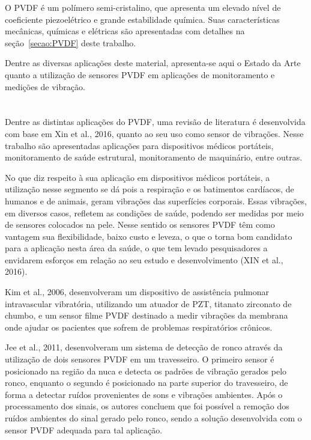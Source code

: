\documentclass[
	12pt,				
	oneside,			
	a4paper,			
	english,			
	brazil,			
	]{abntex2ppgsi}
\begin{document}
O PVDF é um polímero semi-cristalino, que apresenta um elevado nível de coeficiente piezoelétrico e grande estabilidade química. Suas características mecânicas, químicas e elétricas são apresentadas com detalhes na seção~\ref{secao:PVDF} deste trabalho. 

Dentre as diversas aplicações deste material, apresenta-se aqui o Estado da Arte quanto a utilização de sensores PVDF em aplicações de monitoramento e medições de vibração.

\section{}

Dentre as distintas aplicações do PVDF, uma revisão de literatura é desenvolvida com base em Xin et al., 2016, quanto ao seu uso como sensor de vibrações. Nesse trabalho são apresentadas aplicações para dispositivos médicos portáteis, monitoramento de saúde estrutural, monitoramento de maquinário, entre outras.

No que diz respeito à sua aplicação em dispositivos médicos portáteis, a utilização nesse segmento se dá pois a respiração e os batimentos cardíacos, de humanos e de animais, geram vibrações das superfícies corporais. Essas vibrações, em diversos casos, refletem as condições de saúde, podendo ser medidas por meio de sensores colocados na pele. Nesse sentido os sensores PVDF têm como vantagem sua flexibilidade, baixo custo e leveza, o que o torna bom candidato para a aplicação nesta área da saúde, o que tem levado pesquisadores a envidarem esforços em relação ao seu estudo e desenvolvimento (XIN et al., 2016).

Kim et al., 2006, desenvolveram um dispositivo de assistência pulmonar intravascular vibratória, utilizando um atuador de PZT, titanato zirconato de chumbo, e um sensor filme PVDF destinado a medir vibrações da membrana onde ajudar os pacientes que sofrem de problemas respiratórios crônicos.

Jee et al., 2011, desenvolveram um sistema de detecção de ronco através da utilização de dois sensores PVDF em um travesseiro. O primeiro sensor é posicionado na região da nuca e detecta os padrões de vibração gerados pelo ronco, enquanto o segundo é posicionado na parte superior do travesseiro, de forma a detectar ruídos provenientes de sons e vibrações ambientes. Após o processamento dos sinais, os autores concluem que foi possível a remoção dos ruídos ambientes do sinal gerado pelo ronco, sendo a solução desenvolvida com o sensor PVDF adequada para tal aplicação.
\end{document}
